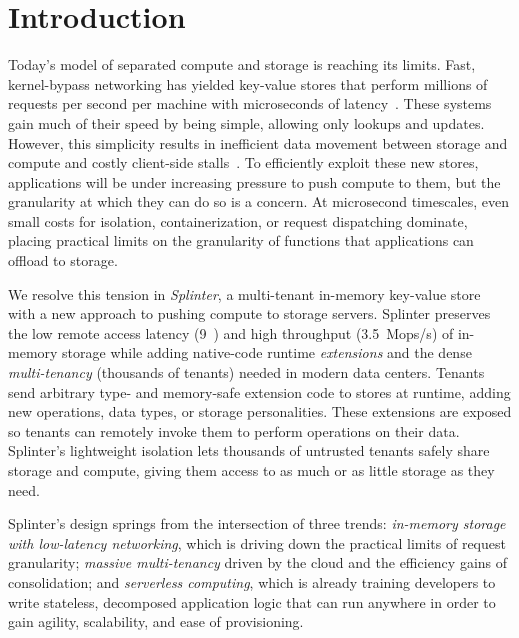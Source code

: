 \section{Introduction}
Today's model of separated compute and storage is reaching its limits.  Fast,
  kernel-bypass networking has yielded key-value stores that perform
  millions of requests per second per machine with microseconds of
  latency~\cite{farm-2014,fasst-2016,mica,ramcloud,drtm}.
These systems gain much of their speed by being simple, allowing only lookups
  and updates.
However, this simplicity results in inefficient data movement between storage and
  compute and costly client-side stalls~\cite{killer-microseconds,grappa}.
To efficiently exploit these new stores, applications will be under
  increasing pressure to push compute to them, but the granularity at which
  they can do so is a concern.
At microsecond timescales, even small costs for isolation, containerization, or
  request dispatching dominate, placing practical limits on the granularity of
  functions that applications can offload to storage.

We resolve this tension in \textsl{Splinter}, a multi-tenant in-memory key-value store with
  a new approach to pushing compute to storage servers.
Splinter preserves the low remote access latency (9~\us) and high throughput (3.5~Mops/s)
  of in-memory storage
  while adding native-code runtime \textsl{extensions} and the dense
  \textsl{multi-tenancy} (thousands of tenants) needed in modern data centers.
Tenants send arbitrary type- and memory-safe extension code to
  stores at runtime, adding new operations, data types, or
  storage personalities.
These extensions are exposed so tenants can remotely
  invoke them to perform operations on
  their data.
Splinter's lightweight isolation lets thousands of untrusted tenants
  safely share storage and compute, giving them access to as
  much or as little storage as they need.

Splinter's design springs from the intersection of three trends:
  \textsl{in-memory storage with low-latency networking}, which is driving down
  the practical limits of request granularity;
\textsl{massive multi-tenancy} driven by the cloud and the efficiency gains of
  consolidation;
and \textsl{serverless computing}, which is already training developers to
  write stateless, decomposed application logic that can run anywhere in order to gain agility,
  scalability, and ease of provisioning.

